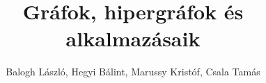 \newcommand*{\authors}{Szerzők}
\newcommand*{\authori}{Balogh László}
\newcommand*{\authorii}{Hegyi Bálint}
\newcommand*{\authoriii}{Marussy Kristóf}
\newcommand*{\authoriv}{Csala Tamás}

\newcommand*{\lecturer}{Előadó}
\newcommand*{\lectureri}{Dr.~Simonyi Gábor}

\newcommand*{\semester}{2016/2017.~tavaszi félév}

\title{Gráfok, hipergráfok és alkalmazásaik}
\newcommand*{\titlepagetitle}{Gráfok, hipergráfok\\és alkalmazásaik}
\author{\authori, \authorii, \authoriii, \authoriv}



